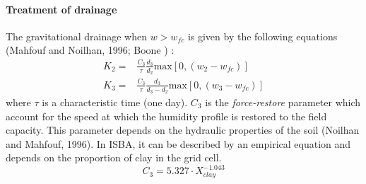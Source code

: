 \paragraph{Treatment of drainage}

The gravitational drainage when $w > w_{fc}$ is given by the following equations 
(Mahfouf and Noilhan, 1996; Boone ) :
%
\begin{eqnarray}
  K_2= & \frac{C_3}{\tau}\frac{d_3}{d_2} \mathrm{max}[0,(w_2 - w_{fc})] \\
  K_3= & \frac{C_3}{\tau}\frac{d_3}{d_3 - d_2} \mathrm{max}[0,(w_3 - w_{fc})] 
\end{eqnarray}
%
where $\tau$ is a characteristic time (one day).
$C_3$ is the \emph{force-restore} parameter which account for the speed
at which the humidity profile is restored to the field capacity. This
parameter depends on the hydraulic properties of the soil
(Noilhan and Mahfouf, 1996). 
In ISBA, it can be described by an empirical equation and depends on the proportion of 
clay in the grid cell.
%
\begin{equation}
  C_3 = 5.327 \cdot X^{-1.043}_{clay}
\end{equation}

%
%
%
%


